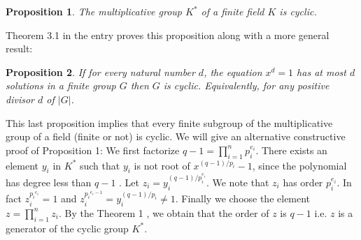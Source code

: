 \documentclass[12pt]{article}
\newtheorem{proposition}{Proposition}
\begin{document}
\begin{proposition} The multiplicative group $K^{*}$ of a finite field $K$ is cyclic.\end{proposition}
Theorem 3.1 in the  entry proves
this proposition along with a more general result:\newline
\begin{proposition} If for every natural number $d$, the equation $x^d = 1$ has at most $d$ solutions in a finite group $G$ then $G$ is cyclic. Equivalently, for any positive divisor $d$ of $|G|$. \end{proposition} This last proposition implies that every finite subgroup of the multiplicative group of a field (finite or not) is cyclic.
\newline
  We will give an alternative constructive proof of Proposition 1:\newline
 We first factorize $q-1 = \prod_{i=1}^n p_i^{e_i}$. There exists an element $y_i$ in $K^{*}$ such that $y_i$ is not root of $x^{(q-1)/p_i} -1$, since the polynomial has degree less than $q-1$ . Let $z_i = y_i^{(q-1)/p_i^{e_i}}$. We note that $z_i$ has order $p_i^{e_i}$. In fact $z_i^{{p_i}^{e_i}} = 1$ and $z_i^{{p_i}^{e_i-1}} = y_i^{(q-1)/p_i} \ne 1$.\newline
 Finally we choose the element $z = \prod_{i=1}^n z_i$. By the Theorem 1 , we obtain that the order of $z$ is $q-1$ i.e. $z$ is a generator of the cyclic group $K^{*}$.
\end{document}
